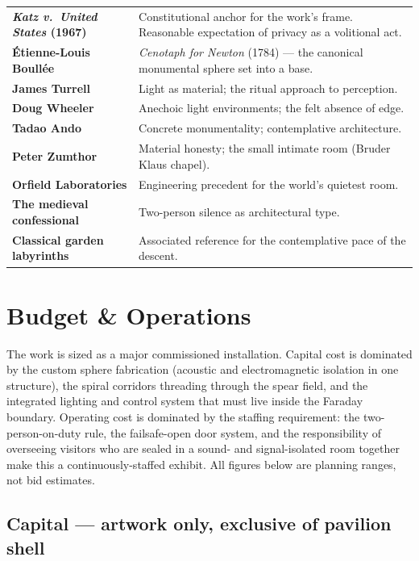 \documentclass[10pt, letterpaper]{article}
\begin{document}
\begin{tabularx}{\textwidth}{@{} >{\bfseries}l X @{}}
\textit{Katz v.\ United States} (1967) & Constitutional anchor for the work's frame. Reasonable expectation of privacy as a volitional act. \\
Étienne-Louis Boullée & \textit{Cenotaph for Newton} (1784) --- the canonical monumental sphere set into a base. \\
James Turrell & Light as material; the ritual approach to perception. \\
Doug Wheeler & Anechoic light environments; the felt absence of edge. \\
Tadao Ando & Concrete monumentality; contemplative architecture. \\
Peter Zumthor & Material honesty; the small intimate room (Bruder Klaus chapel). \\
Orfield Laboratories & Engineering precedent for the world's quietest room. \\
The medieval confessional & Two-person silence as architectural type. \\
Classical garden labyrinths & Associated reference for the contemplative pace of the descent. \\
\end{tabularx}

\section{Budget \& Operations}

The work is sized as a major commissioned installation. Capital cost is dominated by the custom sphere fabrication (acoustic and electromagnetic isolation in one structure), the spiral corridors threading through the spear field, and the integrated lighting and control system that must live inside the Faraday boundary. Operating cost is dominated by the staffing requirement: the two-person-on-duty rule, the failsafe-open door system, and the responsibility of overseeing visitors who are sealed in a sound- and signal-isolated room together make this a continuously-staffed exhibit. All figures below are planning ranges, not bid estimates.

\subsection{Capital --- artwork only, exclusive of pavilion shell}
\end{document}
